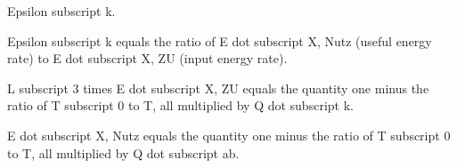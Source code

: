Epsilon subscript k.

Epsilon subscript k equals the ratio of E dot subscript X, Nutz (useful energy rate) to E dot subscript X, ZU (input energy rate).

L subscript 3 times E dot subscript X, ZU equals the quantity one minus the ratio of T subscript 0 to T, all multiplied by Q dot subscript k.

E dot subscript X, Nutz equals the quantity one minus the ratio of T subscript 0 to T, all multiplied by Q dot subscript ab.